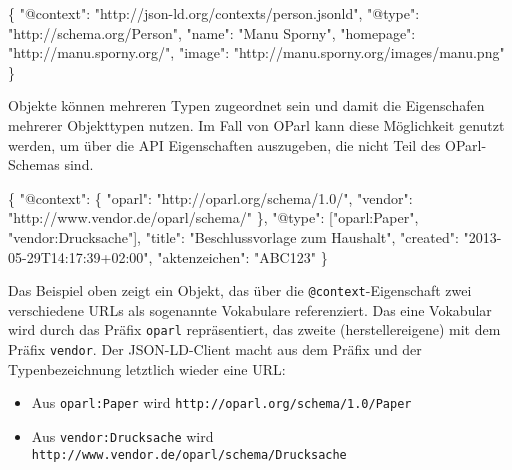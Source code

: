 \documentclass[,a4paper]{article}
\newenvironment{Shaded}{}{}
\newcommand{\DataTypeTok}[1]{\textcolor[rgb]{0.56,0.13,0.00}{{#1}}}
\newcommand{\StringTok}[1]{\textcolor[rgb]{0.25,0.44,0.63}{{#1}}}
\newcommand{\NormalTok}[1]{{#1}}
\begin{document}
\begin{Shaded}
\begin{Highlighting}[]
\NormalTok{\{}
  \DataTypeTok{"@context"}\NormalTok{: }\StringTok{"http://json-ld.org/contexts/person.jsonld"}\NormalTok{,}
  \DataTypeTok{"@type"}\NormalTok{: }\StringTok{"http://schema.org/Person"}\NormalTok{,}
  \DataTypeTok{"name"}\NormalTok{: }\StringTok{"Manu Sporny"}\NormalTok{,}
  \DataTypeTok{"homepage"}\NormalTok{: }\StringTok{"http://manu.sporny.org/"}\NormalTok{,}
  \DataTypeTok{"image"}\NormalTok{: }\StringTok{"http://manu.sporny.org/images/manu.png"}
\NormalTok{\}}
\end{Highlighting}
\end{Shaded}

Objekte können mehreren Typen zugeordnet sein und damit die Eigenschafen
mehrerer Objekttypen nutzen. Im Fall von OParl kann diese Möglichkeit
genutzt werden, um über die API Eigenschaften auszugeben, die nicht Teil
des OParl-Schemas sind.

\begin{Shaded}
\begin{Highlighting}[]
\NormalTok{\{}
  \DataTypeTok{"@context"}\NormalTok{: \{}
    \DataTypeTok{"oparl"}\NormalTok{: }\StringTok{"http://oparl.org/schema/1.0/"}\NormalTok{,}
    \DataTypeTok{"vendor"}\NormalTok{: }\StringTok{"http://www.vendor.de/oparl/schema/"}
  \NormalTok{\},}
  \DataTypeTok{"@type"}\NormalTok{: [}\StringTok{"oparl:Paper"}\NormalTok{, }\StringTok{"vendor:Drucksache"}\NormalTok{],}
  \DataTypeTok{"title"}\NormalTok{: }\StringTok{"Beschlussvorlage zum Haushalt"}\NormalTok{,}
  \DataTypeTok{"created"}\NormalTok{: }\StringTok{"2013-05-29T14:17:39+02:00"}\NormalTok{,}
  \DataTypeTok{"aktenzeichen"}\NormalTok{: }\StringTok{"ABC123"}
\NormalTok{\}}
\end{Highlighting}
\end{Shaded}

Das Beispiel oben zeigt ein Objekt, das über die
\texttt{@context}-Eigenschaft zwei verschiedene URLs als sogenannte
Vokabulare referenziert. Das eine Vokabular wird durch das Präfix
\texttt{oparl} repräsentiert, das zweite (herstellereigene) mit dem
Präfix \texttt{vendor}. Der JSON-LD-Client macht aus dem Präfix und der
Typenbezeichnung letztlich wieder eine URL:

\begin{itemize}
\item
  Aus \texttt{oparl:Paper} wird
  \texttt{http://oparl.org/schema/1.0/Paper}
\item
  Aus \texttt{vendor:Drucksache} wird
  \texttt{http://www.vendor.de/oparl/schema/Drucksache}
\end{itemize}
\end{document}
